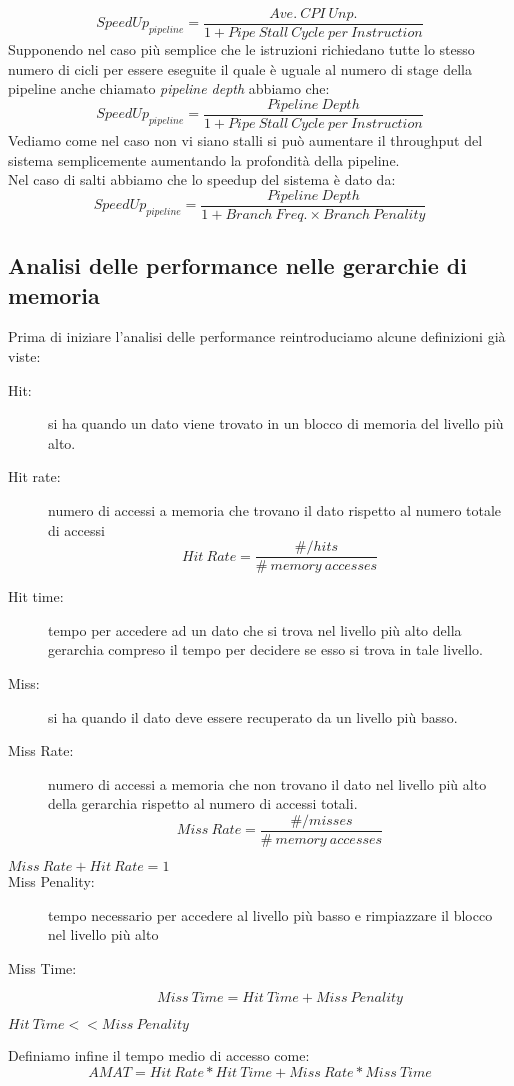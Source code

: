 $$SpeedUp_{pipeline} = \frac{Ave. \ CPI \ Unp.}{1 + Pipe \ Stall \ Cycle \ per \ Instruction}$$
Supponendo nel caso più semplice che le istruzioni richiedano tutte lo stesso numero di cicli per essere eseguite il quale è uguale al numero di stage della pipeline anche chiamato \emph{pipeline depth} abbiamo che:
$$SpeedUp_{pipeline} = \frac{Pipeline \ Depth}{1 + Pipe \ Stall \ Cycle \ per \ Instruction}$$
Vediamo come nel caso non vi siano stalli si può aumentare il throughput del sistema semplicemente aumentando la profondità della pipeline.\\
Nel caso di salti abbiamo che lo speedup del sistema è dato da:
$$SpeedUp_{pipeline} = \frac{Pipeline \ Depth}{1 + Branch \ Freq. \times Branch \ Penality}$$
\subsection{Analisi delle performance nelle gerarchie di memoria}
Prima di iniziare l'analisi delle performance reintroduciamo alcune definizioni già viste:
\begin{description}
\item[Hit:] si ha quando un dato viene trovato in un blocco di memoria del livello più alto.
\item[Hit rate:] numero di accessi a memoria che trovano il dato rispetto al numero totale di accessi
$$Hit \ Rate = \frac{\# / hits}{\# \ memory \ accesses}$$
\item[Hit time:] tempo per accedere ad un dato che si trova nel livello più alto della gerarchia compreso il tempo per decidere se esso si trova in tale livello.
\item[Miss:] si ha quando il dato deve essere recuperato da un livello più basso.
\item[Miss Rate:] numero di accessi a memoria che non trovano il dato nel livello più alto della gerarchia rispetto al numero di accessi totali.
$$Miss \ Rate = \frac{\# / misses}{\# \ memory \ accesses}$$
\item[$Miss \ Rate + Hit \ Rate = 1$]
\item[Miss Penality:] tempo necessario per accedere al livello più basso e rimpiazzare il blocco nel livello più alto
\item[Miss Time:]
$$Miss \ Time = Hit \ Time + Miss \ Penality$$
\item[$Hit \ Time << Miss \ Penality $]
\end{description}
Definiamo infine il tempo medio di accesso come:
$$AMAT = Hit \ Rate * Hit \ Time + Miss \ Rate * Miss \ Time$$

